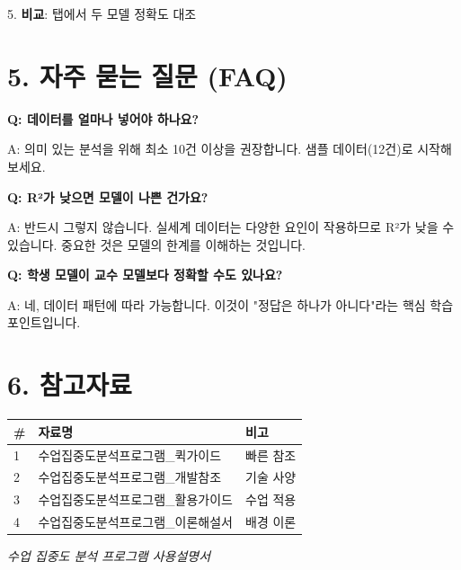 \documentclass[11pt,a4paper]{article}
\begin{document}
5. \textbf{비교}:  탭에서 두 모델 정확도 대조



\section*{5. 자주 묻는 질문 (FAQ)}

\textbf{Q: 데이터를 얼마나 넣어야 하나요?}


A: 의미 있는 분석을 위해 최소 10건 이상을 권장합니다. 샘플 데이터(12건)로 시작해보세요.


\textbf{Q: R²가 낮으면 모델이 나쁜 건가요?}


A: 반드시 그렇지 않습니다. 실세계 데이터는 다양한 요인이 작용하므로 R²가 낮을 수 있습니다. 중요한 것은 모델의 한계를 이해하는 것입니다.


\textbf{Q: 학생 모델이 교수 모델보다 정확할 수도 있나요?}


A: 네, 데이터 패턴에 따라 가능합니다. 이것이 "정답은 하나가 아니다"라는 핵심 학습 포인트입니다.



\section*{6. 참고자료}

\begin{center}
\renewcommand{\arraystretch}{1.4}
\begin{tabular}{|p{1.5cm}|p{10.5cm}|p{3.0cm}|}
\hline
\rowcolor{tableheader}
\textbf{\#} & \textbf{자료명} & \textbf{비고} \\
\hline
1 & 수업집중도분석프로그램\_퀵가이드 & 빠른 참조 \\
\hline
2 & 수업집중도분석프로그램\_개발참조 & 기술 사양 \\
\hline
3 & 수업집중도분석프로그램\_활용가이드 & 수업 적용 \\
\hline
4 & 수업집중도분석프로그램\_이론해설서 & 배경 이론 \\
\hline
\end{tabular}
\end{center}


\vfill
\begin{center}
\small\color{lightbrown}
\textit{수업 집중도 분석 프로그램 사용설명서}
\end{center}
\end{document}
